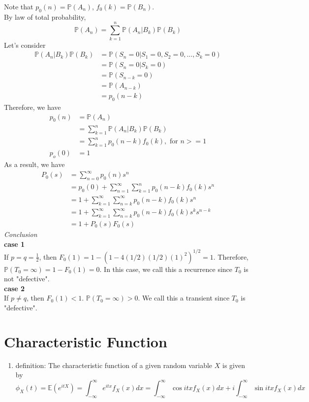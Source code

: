 \documentclass[11pt]{article}
\begin{document}
\begin{enumerate}
Note that $p_0 (n) = \mathbb{P}(A_n)$, $f_0 (k) = \mathbb{P}(B_n)$.\\
By law of total probability,$$\mathbb{P}(A_n) = \sum_{k=1}^{n}\mathbb{P}(A_n | B_k) \mathbb{P}(B_k)$$
Let's consider 
\begin{align*}
\mathbb{P}(A_n | B_k) \mathbb{P}(B_k) &= \mathbb{P}(S_n =0 | S_1 =0 , S_2 =0, ..., S_k =0)\\
&= \mathbb{P}(S_n =0| S_k =0)\\
&= \mathbb{P}(S_{n-k} =0)\\
&= \mathbb{P}(A_{n-k})\\
&= p_0 (n-k)
\end{align*}
Therefore, we have 
\begin{align*}
p_0(n)&=\mathbb{P}(A_n)\\
 &= \sum_{k=1}^{n}\mathbb{P}(A_n | B_k) \mathbb{P}(B_k)\\
&= \sum_{k=1}^{n} p_0 (n-k) f_0(k),\text{ for } n >=1\\
p_o(0)&= 1
\end{align*}
As a result, we have
\begin{align*}
P_0(s) &= \sum_{n=0}^{\infty}p_0(n)s^{n}\\
&= p_0(0) + \sum_{n=1}^{\infty}\sum_{k=1}^{n} p_0 (n-k) f_0(k)s^{n}\\
&= 1 + \sum_{k=1}^{\infty} \sum_{n=k}^{\infty}  p_0 (n-k) f_0(k)s^{n}\\
&= 1 + \sum_{k=1}^{\infty} \sum_{n=k}^{\infty}  p_0 (n-k) f_0(k)s^{k}s^{n-k}\\
&= 1+ P_0(s)F_0(s)
\end{align*}
\textit{Conclusion}\\
\textbf{case 1}\\
If $p=q=\frac{1}{2}$, then $F_0(1)=1-(1-4(1/2)(1/2)(1)^2)^{1/2}=1$. Therefore, $\mathbb{P}(T_0 = \infty) = 1- F_0(1) =0$. In this case, we call this a recurrence since $T_0$ is not "defective".\\
\textbf{case 2}\\
If $p\neq q$, then $F_0(1) <1$. $\mathbb{P}(T_0 = \infty) > 0$. We call this a transient since $T_0$ is "defective".
\end{enumerate}
\newpage
\section{Characteristic Function}
\begin{enumerate}
\item{definition}: 
The characteristic function of a given random variable $X$ is given by $$\phi _{X} (t) = \mathbb{E}(e^{itX})= \int_{-\infty}^{\infty}e^{itx} f_{X}(x) dx = \int_{-\infty}^{\infty} \cos{itx} f_{X}(x) dx + i\int_{-\infty}^{\infty} \sin{itx} f_{X}(x) dx$$
\end{enumerate}
\newpage
\end{document}
